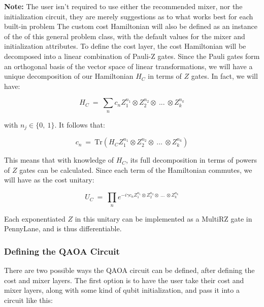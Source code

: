 \documentclass{article}
\begin{document}
\noindent
\textbf{Note:} The user isn't required to use either the recommended mixer, nor the
initialization circuit, they are merely suggestions as to what works best 
for each built-in problem
\newline\newline
\noindent
The custom cost Hamiltonian will also be defined as an instance of the of
this general problem class, with the default values for the mixer and initialization 
attributes. To define the cost layer, the cost Hamiltonian will be decomposed 
into a linear combination of Pauli-Z gates. Since the Pauli gates form an orthogonal
basis of the vector space of linear transformations, we will have a unique decomposition
of our Hamiltonian $H_C$ in terms of $Z$ gates. In fact, we will have:

$$H_C \ = \ \displaystyle\sum_{n} c_n Z_1^{n_1} \otimes Z_2^{n_2} \otimes \ ... \ \otimes Z_{k}^{n_k}$$

\noindent
with $n_j \in \{0, \ 1\}$. It follows that:

$$c_n \ = \ \text{Tr}( H_C Z_1^{n_1} \otimes Z_2^{n_2} \otimes \ ... \ \otimes Z_{k}^{n_k})$$

\noindent
This means that with knowledge of $H_C$, its full decomposition in terms of powers 
of $Z$ gates can be calculated. Since each term of the Hamiltonian commutes, we 
will have as the cost unitary:

$$U_C \ = \ \displaystyle\prod_{n} e^{- i \gamma c_n Z_1^{n_1} \otimes Z_2^{n_2} \otimes \ ... \ \otimes Z_{k}^{n_k}}$$

\noindent
Each exponentiated $Z$ in this unitary can be implemented as a MultiRZ gate in
PennyLane, and is thus differentiable.

\subsubsection{Defining the QAOA Circuit}

There are two possible ways the QAOA circuit can be defined, after 
defining the cost and mixer layers.
\newline\newline
\noindent
The first option is to have the user take their cost and mixer layers, along 
with some kind of qubit initialization, and pass it into a circuit 
like this:
\end{document}
